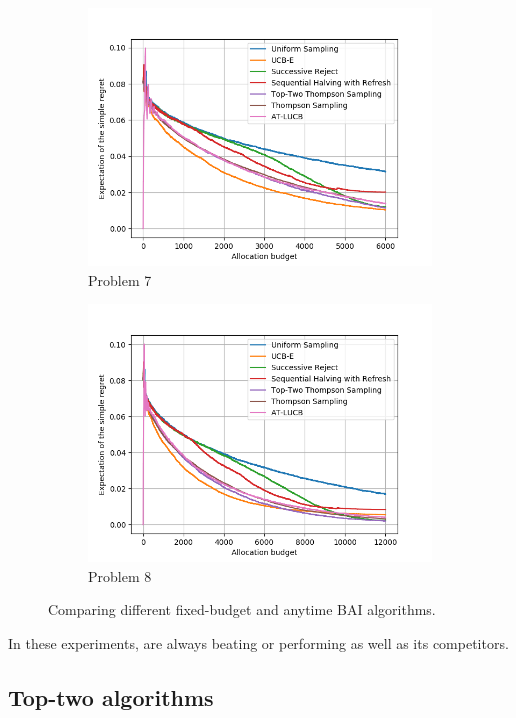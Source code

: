 \documentclass[twoside,11pt]{article}
\begin{document}
\begin{figure}[ht]
\begin{subfigure}[t]{0.2\textwidth}
    \centering\includegraphics[width=\textwidth]{img/bai/setting7.png}
    \caption{Problem 7}
  \end{subfigure}
  \begin{subfigure}[t]{0.2\textwidth}
    \centering\includegraphics[width=\textwidth]{img/bai/setting8.png}
    \caption{Problem 8}
  \end{subfigure}
  \caption{Comparing different fixed-budget and anytime BAI algorithms.}
  \label{fig:bai}
\end{figure}

In these experiments, \TTTS are always beating or performing as well as its competitors.

\subsection{Top-two algorithms}
\end{document}
